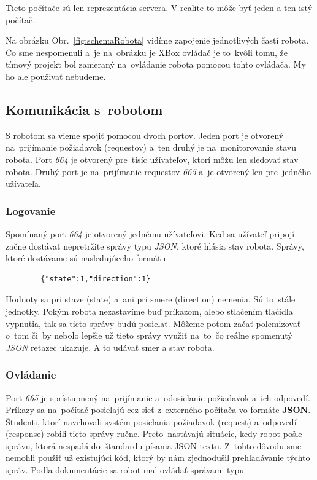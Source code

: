 \noindent Tieto počítače sú len reprezentácia servera. V realite to môže byť jeden a ten istý počítač.

\noindent Na obrázku Obr.~\ref{fig:schemaRobota} vidíme zapojenie jednotlivých častí robota. Čo sme nespomenuli a~je na~obrázku je XBox ovládač je to~kvôli tomu, že
tímový projekt bol zameraný na~ovládanie robota pomocou tohto ovládača. My ho ale použivať nebudeme.

\subsection{Komunikácia s~robotom}

S robotom sa vieme spojiť pomocou dvoch portov. Jeden port je otvorený na~prijímanie požiadavok (requestov) a~ten druhý je na~monitorovanie stavu robota.
Port \textit{664} je otvorený pre~tisíc užívateľov, ktorí môžu len sledovať stav robota. Druhý port je na~prijímanie requestov \textit{665} a~je otvorený
len pre~jedného užívateľa.

\subsubsection{Logovanie}

Spomínaný port \textit{664} je otvorený jednému užívateľovi. Keď sa užívateľ pripojí začne dostávať nepretržite správy typu \textit{JSON}, ktoré hlásia
stav robota. Správy, ktoré dostávame sú nasledujúceho formátu
\begin{lstlisting}
		{"state":1,"direction":1}
\end{lstlisting}
Hodnoty sa pri stave (state) a~ani pri smere (direction) nemenia. Sú to~stále jednotky. Pokým robota nezastavíme buď príkazom, alebo stlačením tlačidla vypnutia,
tak sa tieto správy budú posielať. Môžeme potom začať polemizovať o~tom či~by nebolo lepšie už tieto správy využiť na~to~čo reálne spomenutý \textit{JSON}
reťazec ukazuje. A to udávať smer a stav robota.

\subsubsection{Ovládanie}

Port \textit{665} je sprístupnený na~prijímanie a~odosielanie požiadavok a~ich odpovedí. Príkazy sa na~počítač posielajú cez sieť z~externého počítača vo formáte
\textbf{JSON}. Študenti, ktorí navrhovali systém posielania požiadavok (request) a~odpovedí (response) robili tieto správy ručne. Preto~nastávajú situácie, kedy
robot pošle správu, ktorá nespadá do~štandardu písania JSON textu. Z~tohto dôvodu sme nemohli použiť už existujúci kód, ktorý by nám zjednodušil prehľadávanie
týchto správ. Podla dokumentácie sa robot mal ovládať správami typu~\cite{BMdoc}

